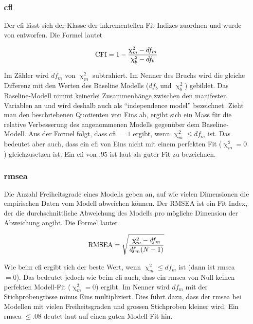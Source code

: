 \documentclass[11pt, twoside, a4paper]{book}		%
\begin{document}
\subsubsection*{\gls{cfi}}
Der \gls{cfi} lässt sich der Klasse der inkrementellen Fit Indizes zuordnen und wurde von \citet{Bentler1990} entworfen. Die Formel lautet

$$ \textnormal{CFI} = 1 - \frac{\upchi^2_{m}-df_{m}}{\upchi^2_{b}-df_{b}} $$

\noindent Im Zähler wird $df_{m}$ von $\upchi^2_{m}$ subtrahiert. Im Nenner des Bruchs wird die gleiche Differenz mit den Werten des Baseline Modells ($df_{b}$ und $\upchi^2_{b}$) gebildet.
Das Baseline-Modell nimmt keinerlei Zusammenhänge zwischen den manifesten Variablen an und wird deshalb auch als \enquote{independence model} bezeichnet. Zieht man den beschriebenen Quotienten von Eins ab, ergibt sich ein Mass für die relative Verbesserung des angenommenen Modells gegenüber dem Baseline-Modell. Aus der Formel folgt, dass \gls{cfi} $= 1$ ergibt, wenn $\upchi^2_{m} \leq df_{m}$ ist. Das bedeutet aber auch, dass ein \gls{cfi} von Eins nicht mit einem perfekten Fit ($\upchi^2_{m} = 0$) gleichzusetzen ist. Ein \gls{cfi} von $.95$ ist laut \citet{Hu1999} als guter Fit zu bezeichnen.

\subsubsection*{\gls{rmsea}}
Die Anzahl Freiheitsgrade eines Modells geben an, auf wie vielen Dimensionen die empirischen Daten vom Modell abweichen können. Der RMSEA \citep{Steiger1990} ist ein Fit Index, der die durchschnittliche Abweichung des Modells pro mögliche Dimension der Abweichung angibt. Die Formel lautet

$$ \textnormal{RMSEA} = \sqrt{ \frac{\upchi^2_{m}-df_{m}}{df_{m}(N-1)} } $$

\noindent Wie beim \gls{cfi} ergibt sich der beste Wert, wenn $\upchi^2_{m} \leq df_{m}$ ist (dann ist \gls{rmsea} $= 0$). Das bedeutet jedoch wie beim \gls{cfi} auch, dass ein \gls{rmsea} von Null keinen perfekten Modell-Fit ($\upchi^2_{m} = 0$) ergibt. Im Nenner wird $df_{m}$ mit der Stichprobengrösse minus Eins multipliziert. Dies führt dazu, dass der \gls{rmsea} bei Modellen mit vielen Freiheitsgraden und grossen Stichproben kleiner wird. Ein \gls{rmsea} $\leq.08$ deutet laut \citet{Browne1993} auf einen guten Modell-Fit hin.
\end{document}
